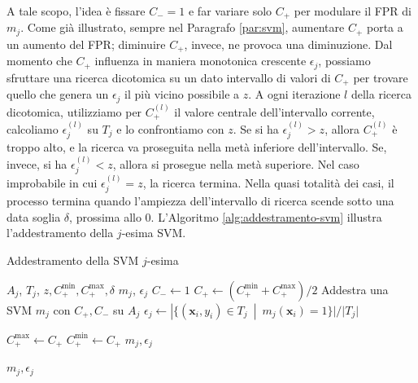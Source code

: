 A tale scopo, l'idea è fissare $C_- = 1$ e far variare solo $C_+$ per modulare il FPR di $m_j$. Come già illustrato, sempre nel Paragrafo \ref{par:svm}, aumentare $C_+$ porta a un aumento del FPR; diminuire $C_+$, invece, ne provoca una diminuzione. Dal momento che $C_+$ influenza in maniera monotonica crescente $\epsilon_j$, possiamo sfruttare una ricerca dicotomica su un dato intervallo di valori di $C_+$ per trovare quello che genera un $\epsilon_j$ il più vicino possibile a $z$.
A ogni iterazione $l$ della ricerca dicotomica, utilizziamo per $C_+^{(l)}$ il valore centrale dell'intervallo corrente, calcoliamo $\epsilon_j^{(l)}$ su $T_j$ e lo confrontiamo con $z$. Se si ha $\epsilon_j^{(l)} > z$, allora $C_+^{(l)}$ è troppo alto, e la ricerca va proseguita nella metà inferiore dell'intervallo. Se, invece, si ha $\epsilon_j^{(l)} < z$, allora si prosegue nella metà superiore. Nel caso improbabile in cui $\epsilon_j^{(l)} = z$, la ricerca termina.
Nella quasi totalità dei casi, il processo termina quando l'ampiezza dell'intervallo di ricerca scende sotto una data soglia $\delta$, prossima allo 0.
L'Algoritmo \ref{alg:addestramento-svm} illustra l'addestramento della $j$-esima SVM.

\begin{algorithm}
    \caption{Addestramento della SVM $j$-esima}
    \begin{algorithmic}[1]
        \Require $A_j$, $T_j$, $z, C_+^{\text{min}}, C_+^{\text{max}}, \delta$
        \Ensure $m_j$, $\epsilon_j$
        \State $C_- \gets 1$
            \State $C_+ \gets (C_+^{\text{min}}+C_+^{\text{max}})/2$
            \State Addestra una SVM $m_j$ con $C_+, C_-$ su $A_j$
            \State $\epsilon_j \gets |\{(\mathbf{x}_i, y_i) \in T_j \enspace | \enspace m_j(\mathbf{x}_i) = 1 \}|/|T_j|$

                \State $C_+^{\text{max}} \gets C_+$
                \State $C_+^{\text{min}} \gets C_+$
            \Else
                \State \Return $m_j, \epsilon_j$
            \EndIf
            
        \EndWhile
        \State \Return $m_j, \epsilon_j$
    \end{algorithmic}
    \label{alg:addestramento-svm}
\end{algorithm}








